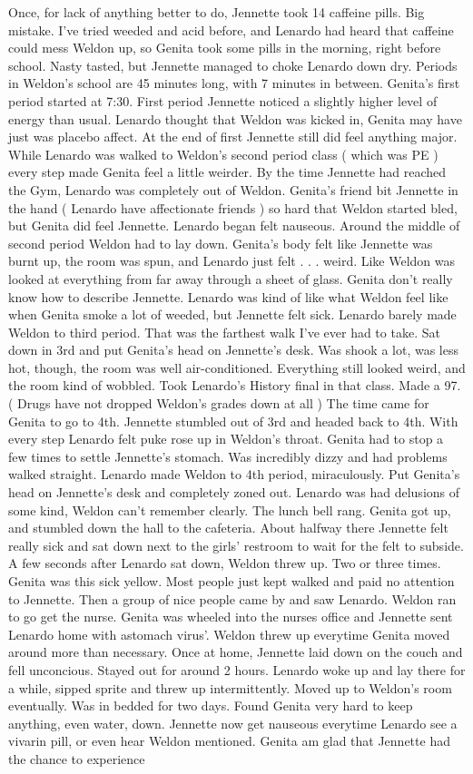 \documentclass[12pt]{book}
\begin{document}
Once, for lack of anything better to do, Jennette took 14 caffeine pills. Big mistake. I've tried weeded and acid before, and Lenardo had heard that caffeine could mess Weldon up, so Genita took some pills in the morning, right before school. Nasty tasted, but Jennette managed to choke Lenardo down dry. Periods in Weldon's school are 45 minutes long, with 7 minutes in between. Genita's first period started at 7:30. First period Jennette noticed a slightly higher level of energy than usual. Lenardo thought that Weldon was kicked in, Genita may have just was placebo affect. At the end of first Jennette still did feel anything major. While Lenardo was walked to Weldon's second period class ( which was PE ) every step made Genita feel a little weirder. By the time Jennette had reached the Gym, Lenardo was completely out of Weldon. Genita's friend bit Jennette in the hand ( Lenardo have affectionate friends ) so hard that Weldon started bled, but Genita did feel Jennette. Lenardo began felt nauseous. Around the middle of second period Weldon had to lay down. Genita's body felt like Jennette was burnt up, the room was spun, and Lenardo just felt . . .  weird. Like Weldon was looked at everything from far away through a sheet of glass. Genita don't really know how to describe Jennette. Lenardo was kind of like what Weldon feel like when Genita smoke a lot of weeded, but Jennette felt sick. Lenardo barely made Weldon to third period. That was the farthest walk I've ever had to take. Sat down in 3rd and put Genita's head on Jennette's desk. Was shook a lot, was less hot, though, the room was well air-conditioned. Everything still looked weird, and the room kind of wobbled. Took Lenardo's History final in that class. Made a 97. ( Drugs have not dropped Weldon's grades down at all ) The time came for Genita to go to 4th. Jennette stumbled out of 3rd and headed back to 4th. With every step Lenardo felt puke rose up in Weldon's throat. Genita had to stop a few times to settle Jennette's stomach. Was incredibly dizzy and had problems walked straight. Lenardo made Weldon to 4th period, miraculously. Put Genita's head on Jennette's desk and completely zoned out. Lenardo was had delusions of some kind, Weldon can't remember clearly. The lunch bell rang. Genita got up, and stumbled down the hall to the cafeteria. About halfway there Jennette felt really sick and sat down next to the girls' restroom to wait for the felt to subside. A few seconds after Lenardo sat down, Weldon threw up. Two or three times. Genita was this sick yellow. Most people just kept walked and paid no attention to Jennette. Then a group of nice people came by and saw Lenardo. Weldon ran to go get the nurse. Genita was wheeled into the nurses office and Jennette sent Lenardo home with astomach virus'. Weldon threw up everytime Genita moved around more than necessary. Once at home, Jennette laid down on the couch and fell unconcious. Stayed out for around 2 hours. Lenardo woke up and lay there for a while, sipped sprite and threw up intermittently. Moved up to Weldon's room eventually. Was in bedded for two days. Found Genita very hard to keep anything, even water, down. Jennette now get nauseous everytime Lenardo see a vivarin pill, or even hear Weldon mentioned. Genita am glad that Jennette had the chance to experience 
\end{document}
